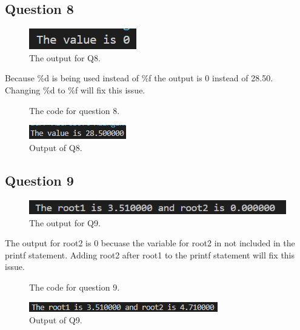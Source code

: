 \documentclass{article}
\begin{document}
\begin{flushleft}
  \subsection{Question 8}
  \begin{figure}[!ht]
    \centering
    \includegraphics[width=\linewidth]{Q8-error.png}
    \caption{The output for Q8.}
  \end{figure}
  Because \%d is being used instead of \%f the output is 0 instead of 28.50. Changing \%d to \%f will fix this issue.
  \begin{figure}[!ht]
    \centering
    
    \caption{The code for question 8.}
  \end{figure}
  \begin{figure}[!ht]
    \centering
    \includegraphics[width=\linewidth]{Q8-output.png}
    \caption{Output of Q8.}
  \end{figure}
  \newpage
  \subsection{Question 9}
  \begin{figure}[!ht]
    \centering
    \includegraphics[width=\linewidth]{Q9-error.png}
    \caption{The output for Q9.}
  \end{figure}
  The output for root2 is 0 becuase the variable for root2 in not included in the printf statement. Adding root2 after root1 to the printf statement will fix this issue.
  \begin{figure}[!ht]
    \centering
    
    \caption{The code for question 9.}
  \end{figure}
  \begin{figure}[!ht]
    \centering
    \includegraphics[width=\linewidth]{Q9-output.png}
    \caption{Output of Q9.}
  \end{figure}
  \newpage

\end{flushleft}
\end{document}
